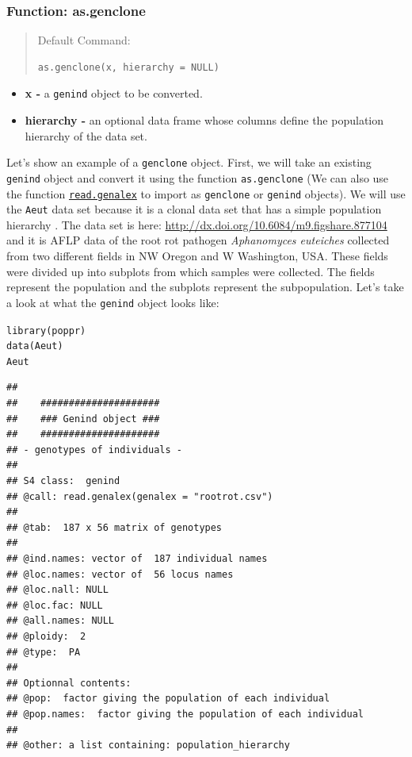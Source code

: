 \documentclass[letterpaper]{article}\usepackage[]{graphicx}\usepackage[]{color}
\makeatletter
\newcommand{\hlstd}[1]{\textcolor[rgb]{0,0,0}{#1}}%
\newcommand{\hlkwd}[1]{\textcolor[rgb]{0,0.267,0.4}{#1}}%
\newenvironment{kframe}{%
 \def\at@end@of@kframe{}%
 \ifinner\ifhmode%
  \def\at@end@of@kframe{\end{minipage}}%
  \begin{minipage}{\columnwidth}%
 \fi\fi%
 \def\FrameCommand##1{\hskip\@totalleftmargin \hskip-\fboxsep
 \colorbox{shadecolor}{##1}\hskip-\fboxsep
     \hskip-\linewidth \hskip-\@totalleftmargin \hskip\columnwidth}%
 \MakeFramed {\advance\hsize-\width
   \@totalleftmargin\z@ \linewidth\hsize
   \@setminipage}}%
 {\par\unskip\endMakeFramed%
 \at@end@of@kframe}
\newenvironment{knitrout}{}{} %
\makeatother
\begin{document}
\subsubsection{Function: as.genclone}\label{intro:genclone:as.genclone}
\begin{quote}
Default Command:
\begin{knitrout}
\color{fgcolor}\begin{kframe}
\begin{verbatim}
as.genclone(x, hierarchy = NULL)
\end{verbatim}
\end{kframe}
\end{knitrout}

\end{quote}
\begin{itemize}
  \item \textbf{x -} a \texttt{genind} object to be converted.
  \item \textbf{hierarchy -} an optional data frame whose columns define the 
  population hierarchy of the data set.
\end{itemize}

Let's show an example of a \texttt{genclone} object. First, we will take an 
existing \texttt{genind} object and convert it using the function 
\texttt{as.genclone} (We can also use the function 
\texttt{\hyperref[intro:import:read.genalex]{read.genalex}} to import as
\texttt{genclone} or \texttt{genind} objects). We will use the \texttt{Aeut}
data set because it is a clonal data set that has a simple population hierarchy
\cite{Grunwald:2006}. The data set is here: \url{http://dx.doi.org/10.6084/m9.figshare.877104} and it is AFLP data of the root rot
pathogen \textit{Aphanomyces euteiches} collected from two different fields in
NW Oregon and W Washington, USA. These fields were divided up into subplots from
which samples were collected. The fields represent the population and the
subplots represent the subpopulation. 
Let's take a look at what the \texttt{genind} object looks like:
\begin{knitrout}\footnotesize
{}\color{fgcolor}\begin{kframe}
\begin{alltt}
\hlkwd{library}\hlstd{(poppr)}
\hlkwd{data}\hlstd{(Aeut)}
\hlstd{Aeut}
\end{alltt}
\begin{verbatim}
## 
##    #####################
##    ### Genind object ### 
##    #####################
## - genotypes of individuals - 
## 
## S4 class:  genind
## @call: read.genalex(genalex = "rootrot.csv")
## 
## @tab:  187 x 56 matrix of genotypes
## 
## @ind.names: vector of  187 individual names
## @loc.names: vector of  56 locus names
## @loc.nall: NULL
## @loc.fac: NULL
## @all.names: NULL
## @ploidy:  2
## @type:  PA
## 
## Optionnal contents: 
## @pop:  factor giving the population of each individual
## @pop.names:  factor giving the population of each individual
## 
## @other: a list containing: population_hierarchy
\end{verbatim}
\end{kframe}
\end{knitrout}
\end{document}
